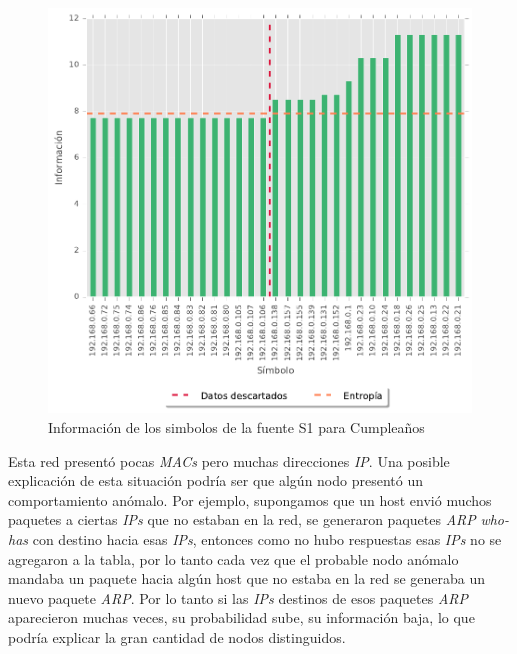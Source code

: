\begin{figure}
  \begin{center}
    \includegraphics[scale = 0.5]{img/Cumple-information-S1.pdf}
    \caption{Información de los simbolos de la fuente S1 para Cumpleaños}
    \label{informacion_cumple}
  \end{center}
\end{figure}

Esta red presentó pocas \textit{MACs} pero muchas direcciones \textit{IP}.
Una posible explicación de esta situación podría ser que algún nodo presentó un comportamiento anómalo. Por ejemplo, supongamos que un host envió muchos paquetes a ciertas \textit{IPs} que no estaban en la red, se generaron paquetes \textit{ARP} \textit{who-has} con destino hacia esas \textit{IPs}, entonces como no hubo respuestas esas \textit{IPs} no se agregaron a la tabla, por lo tanto cada vez que el probable nodo anómalo mandaba un paquete hacia algún host que no estaba en la red se generaba un nuevo paquete \textit{ARP}. Por lo tanto si las \textit{IPs} destinos de esos paquetes \textit{ARP} aparecieron muchas veces, su probabilidad sube, su información baja, lo que podría explicar la gran cantidad de nodos distinguidos.